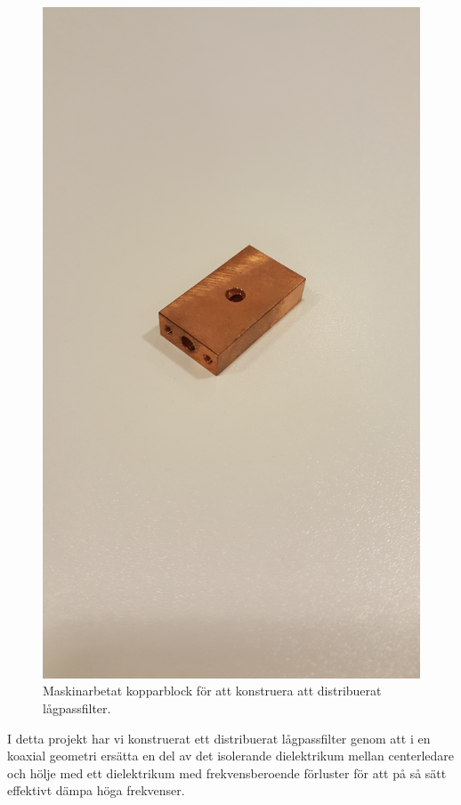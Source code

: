 \documentclass[main.tex]{subfiles}
\begin{document}
\begin{figure}
    \centering
    \includegraphics[angle=-90,trim=1550 300 1950 300,clip,width=0.975\linewidth]{figure/Filterbilder/filterbox.jpg}
    \caption{Maskinarbetat kopparblock för att konstruera att distribuerat lågpassfilter.}
    \label{fig:filterbox}
\end{figure}
I detta projekt har vi konstruerat ett distribuerat lågpassfilter genom att i en koaxial geometri ersätta en del av det isolerande dielektrikum mellan centerledare och hölje med ett dielektrikum med frekvensberoende förluster för att på så sätt effektivt dämpa höga frekvenser.  
\end{document}

